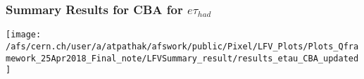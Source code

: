 \documentclass{beamer}
\begin{document}
\begin{frame}
\frametitle{Summary Results for CBA for $e\tau_{had}$}
\begin{normalsize}
\begin{minipage}{\textwidth}
\begin{minipage}[c]{0.79\textwidth}
\centering
\texttt{[image: /afs/cern.ch/user/a/atpathak/afswork/public/Pixel/LFV\_Plots/Plots\_Qframework\_25Apr2018\_Final\_note/LFVSummary\_result/results\_etau\_CBA\_updated]}\\
\end{minipage}
\begin{minipage}[c]{0.19\textwidth}
\centering
\vspace*{0.6cm}
\begin{table}
{}
\end{table}
\vspace*{-0.6cm}
\begin{table}
{}
\end{table}
\end{minipage}
\end{minipage}
\end{normalsize}
\end{frame}
\end{document}
